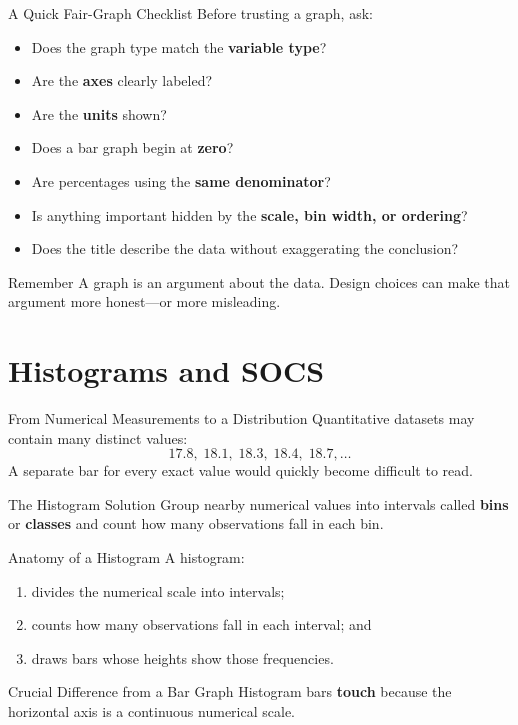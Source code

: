 \documentclass[aspectratio=169]{beamer}
\begin{document}
\begin{frame}{A Quick Fair-Graph Checklist}
  Before trusting a graph, ask:
  \begin{itemize}
    \item Does the graph type match the \textbf{variable type}?
    \item Are the \textbf{axes} clearly labeled?
    \item Are the \textbf{units} shown?
    \item Does a bar graph begin at \textbf{zero}?
    \item Are percentages using the \textbf{same denominator}?
    \item Is anything important hidden by the \textbf{scale, bin width, or ordering}?
    \item Does the title describe the data without exaggerating the conclusion?
  \end{itemize}
  \begin{alertblock}{Remember}
    A graph is an argument about the data. Design choices can make that argument more honest---or more misleading.
  \end{alertblock}
\end{frame}

\section{Histograms and SOCS}

\begin{frame}{From Numerical Measurements to a Distribution}
  Quantitative datasets may contain many distinct values:
  \[
    17.8,\;18.1,\;18.3,\;18.4,\;18.7,\ldots
  \]
  A separate bar for every exact value would quickly become difficult to read.
  \vspace{0.2cm}
  \begin{block}{The Histogram Solution}
    Group nearby numerical values into intervals called \textbf{bins} or \textbf{classes} and count how many observations fall in each bin.
  \end{block}
\end{frame}

\begin{frame}{Anatomy of a Histogram}
  A histogram:
  \begin{enumerate}
    \item divides the numerical scale into intervals;
    \item counts how many observations fall in each interval; and
    \item draws bars whose heights show those frequencies.
  \end{enumerate}
  \vspace{0.2cm}
  \begin{alertblock}{Crucial Difference from a Bar Graph}
    Histogram bars \textbf{touch} because the horizontal axis is a continuous numerical scale.
  \end{alertblock}
\end{frame}
\end{document}
